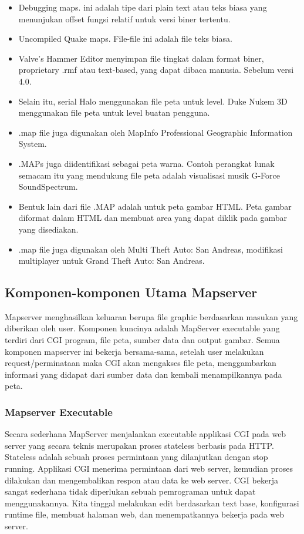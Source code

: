 \begin{itemize}
	\item Debugging maps. ini adalah tipe dari plain text atau teks biasa yang menunjukan offset fungsi relatif untuk versi biner tertentu.
	\item Uncompiled Quake maps. File-file ini adalah file teks biasa.
	\item Valve's Hammer Editor menyimpan file tingkat dalam format biner, proprietary .rmf atau text-based, yang dapat dibaca manusia. Sebelum versi 4.0.
	\item Selain itu, serial Halo menggunakan file peta untuk level. Duke Nukem 3D menggunakan file peta untuk level buatan pengguna.
	\item .map file juga digunakan oleh MapInfo Professional Geographic Information System.
	\item .MAPs juga diidentifikasi sebagai peta warna. Contoh perangkat lunak semacam itu yang mendukung file peta adalah visualisasi musik G-Force SoundSpectrum.
	\item Bentuk lain dari file .MAP adalah untuk peta gambar HTML. Peta gambar diformat dalam HTML dan membuat area yang dapat diklik pada gambar yang disediakan.
	\item .map file juga digunakan oleh Multi Theft Auto: San Andreas, modifikasi multiplayer untuk Grand Theft Auto: San Andreas.
\end{itemize}

\subsection{Komponen-komponen Utama Mapserver}
Mapserver menghasilkan keluaran berupa file graphic berdasarkan masukan yang diberikan oleh user. Komponen kuncinya adalah MapServer executable yang terdiri dari CGI program, file peta, sumber data dan output gambar. Semua komponen mapserver ini bekerja bersama-sama, setelah user melakukan request/perminataan maka CGI akan mengakses file peta, menggambarkan informasi yang didapat dari sumber data dan kembali menampilkannya pada peta.

	\subsubsection {Mapserver Executable}
		Secara sederhana MapServer menjalankan executable applikasi CGI pada web server yang secara teknis merupakan proses
 		stateless berbasis pada HTTP. Stateless adalah sebuah proses permintaan yang dilanjutkan dengan stop running. Applikasi CGI 		
		menerima permintaan dari web server, kemudian proses dilakukan dan mengembalikan respon atau data ke web server. CGI bekerja 		
		sangat sederhana tidak diperlukan sebuah pemrograman untuk dapat menggunakannya. Kita tinggal melakukan edit berdasarkan text base,
		konfigurasi runtime file, membuat halaman web, dan menempatkannya bekerja pada web server.
		

